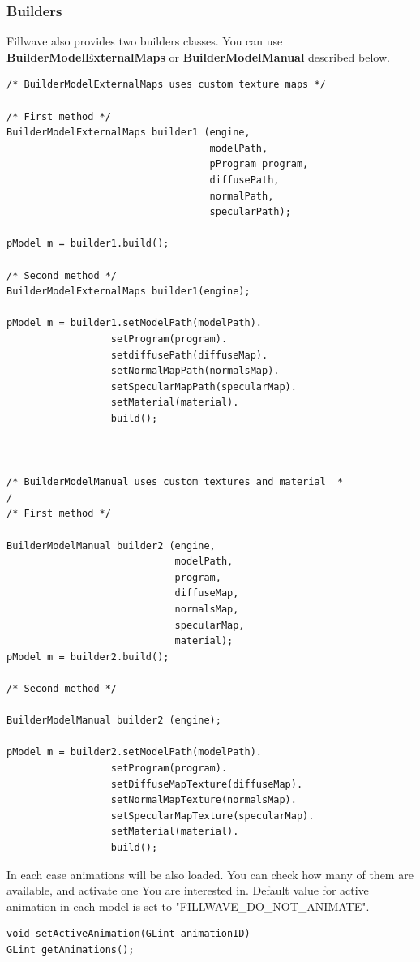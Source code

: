 \documentclass{article}
\begin{document}
\subsubsection{Builders}\label{sec:builderCreation}
\indent \indent Fillwave also provides two builders classes. You can use \textbf{BuilderModelExternalMaps} or \textbf{BuilderModelManual} described below.
\begin{lstlisting}
/* BuilderModelExternalMaps uses custom texture maps */

/* First method */
BuilderModelExternalMaps builder1 (engine,
                                   modelPath,
                                   pProgram program,
                                   diffusePath,
                                   normalPath,
                                   specularPath);

pModel m = builder1.build();

/* Second method */
BuilderModelExternalMaps builder1(engine);

pModel m = builder1.setModelPath(modelPath).
                  setProgram(program).
                  setdiffusePath(diffuseMap).
                  setNormalMapPath(normalsMap).
                  setSpecularMapPath(specularMap).
                  setMaterial(material).
                  build();



/* BuilderModelManual uses custom textures and material  *
/
/* First method */

BuilderModelManual builder2 (engine,
                             modelPath,
                             program,
                             diffuseMap,
                             normalsMap,
                             specularMap,
                             material);
pModel m = builder2.build();

/* Second method */

BuilderModelManual builder2 (engine);

pModel m = builder2.setModelPath(modelPath).
                  setProgram(program).
                  setDiffuseMapTexture(diffuseMap).
                  setNormalMapTexture(normalsMap).
                  setSpecularMapTexture(specularMap).
                  setMaterial(material).
                  build();

\end{lstlisting}

\indent In each case animations will be also loaded. You can check how many of them are available, and activate one You are interested in. Default value for active animation in each model is set to "FILLWAVE\_DO\_NOT\_ANIMATE".
\begin{lstlisting}
void setActiveAnimation(GLint animationID)
GLint getAnimations();
\end{lstlisting}
\end{document}
